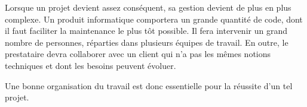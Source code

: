 
Lorsque un projet devient assez conséquent, sa gestion devient de plus en plus complexe. Un produit informatique comportera un grande quantité de code, dont il faut faciliter la maintenance le plus tôt possible. Il fera intervenir un grand nombre de personnes, réparties dans plusieurs équipes de travail.
En outre, le prestataire devra collaborer avec un client qui n'a pas les mêmes notions techniques et dont les besoins peuvent évoluer.

Une bonne organisation du travail est donc essentielle pour la réussite d'un tel projet.

